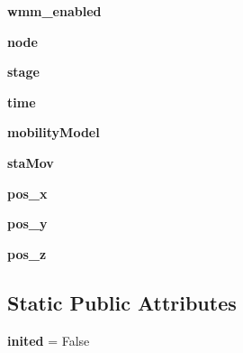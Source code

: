 \begin{DoxyCompactItemize}
\item 
\hypertarget{classmininet_1_1net_1_1Mininet_a86a8bf39b73e68a05d5b510acc370f5d}{{\bfseries wmm\-\_\-enabled}}\label{classmininet_1_1net_1_1Mininet_a86a8bf39b73e68a05d5b510acc370f5d}

\item 
\hypertarget{classmininet_1_1net_1_1Mininet_a89e1711664ad277b7c121b6e2a6f1adc}{{\bfseries node}}\label{classmininet_1_1net_1_1Mininet_a89e1711664ad277b7c121b6e2a6f1adc}

\item 
\hypertarget{classmininet_1_1net_1_1Mininet_a4ace2969c4abb59b26b3610179c997b8}{{\bfseries stage}}\label{classmininet_1_1net_1_1Mininet_a4ace2969c4abb59b26b3610179c997b8}

\item 
\hypertarget{classmininet_1_1net_1_1Mininet_ab86c5f213bcbd5c1ea13cf45b7fcfc86}{{\bfseries time}}\label{classmininet_1_1net_1_1Mininet_ab86c5f213bcbd5c1ea13cf45b7fcfc86}

\item 
\hypertarget{classmininet_1_1net_1_1Mininet_ac5906f7c56faf8063fea24c9056100b9}{{\bfseries mobility\-Model}}\label{classmininet_1_1net_1_1Mininet_ac5906f7c56faf8063fea24c9056100b9}

\item 
\hypertarget{classmininet_1_1net_1_1Mininet_aba20ed4cd5a64bb2133d11363527e734}{{\bfseries sta\-Mov}}\label{classmininet_1_1net_1_1Mininet_aba20ed4cd5a64bb2133d11363527e734}

\item 
\hypertarget{classmininet_1_1net_1_1Mininet_a807e52789ce35d7a43c76808cf96a800}{{\bfseries pos\-\_\-x}}\label{classmininet_1_1net_1_1Mininet_a807e52789ce35d7a43c76808cf96a800}

\item 
\hypertarget{classmininet_1_1net_1_1Mininet_a0577d1f66795ceec5787a0234c971456}{{\bfseries pos\-\_\-y}}\label{classmininet_1_1net_1_1Mininet_a0577d1f66795ceec5787a0234c971456}

\item 
\hypertarget{classmininet_1_1net_1_1Mininet_a7407c121fa7823b87358fb917ce6c566}{{\bfseries pos\-\_\-z}}\label{classmininet_1_1net_1_1Mininet_a7407c121fa7823b87358fb917ce6c566}

\end{DoxyCompactItemize}
\subsection*{Static Public Attributes}
\begin{DoxyCompactItemize}
\item 
\hypertarget{classmininet_1_1net_1_1Mininet_a26dff81a193e45962b584629f937c0cd}{{\bfseries inited} = False}\label{classmininet_1_1net_1_1Mininet_a26dff81a193e45962b584629f937c0cd}

\end{DoxyCompactItemize}


